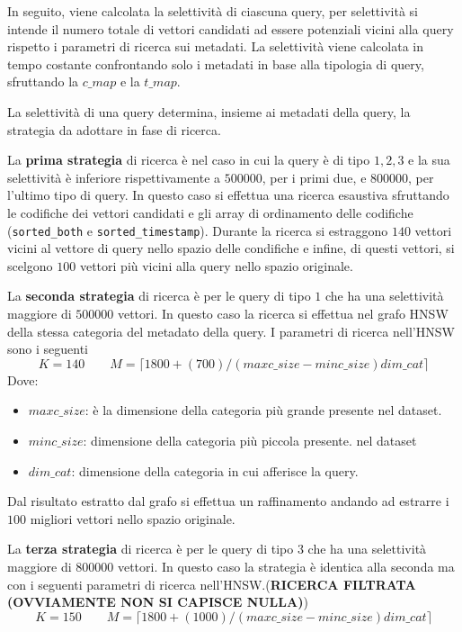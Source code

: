 In seguito, viene calcolata la selettività di ciascuna query, per selettività
si intende il numero totale di vettori candidati ad essere potenziali vicini alla 
query rispetto i parametri di ricerca sui metadati. 
La selettività viene calcolata in tempo costante confrontando solo i metadati in 
base alla tipologia di query, sfruttando la $c\_map$ e la $t\_map$. 

La selettività di una query determina, insieme ai metadati della query, la strategia 
da adottare in fase di ricerca.

La \textbf{prima strategia} di ricerca è nel caso in cui la query è di tipo $1,2,3$ 
e la sua selettività è inferiore rispettivamente a $500000$, per i primi due, e $800000$, 
per l'ultimo tipo di query. In questo caso 
si effettua una ricerca esaustiva sfruttando le codifiche dei vettori candidati 
e gli array di ordinamento delle codifiche (\texttt{sorted\_both} e \texttt{sorted\_timestamp}).
Durante la ricerca si estraggono $140$ vettori vicini al vettore di query nello 
spazio delle condifiche e infine, di questi vettori, si scelgono $100$ vettori 
più vicini alla query nello spazio originale. 

La \textbf{seconda strategia} di ricerca è per le query di tipo $1$ che ha una selettività 
maggiore di $500000$ vettori. In questo caso la ricerca si effettua nel grafo 
HNSW della stessa categoria del metadato della query. I parametri di ricerca nell'HNSW
sono i seguenti 
$$K = 140 \qquad M= \lceil1800+(700)/(maxc\_size - minc\_size)dim\_cat\rceil$$
Dove:
\begin{itemize}
    \item $maxc\_size$: è la dimensione della categoria più grande presente 
    nel dataset.
    \item $minc\_size$: dimensione della categoria più piccola presente.
    nel dataset
    \item $dim\_cat$: dimensione della categoria in cui afferisce la query.
\end{itemize}
Dal risultato estratto dal grafo si effettua un raffinamento andando ad estrarre 
i $100$ migliori vettori nello spazio originale.

La \textbf{terza strategia} di ricerca è per le query di tipo $3$ che ha una selettività 
maggiore di $800000$ vettori. In questo caso la strategia è identica alla seconda 
ma con i seguenti parametri di ricerca nell'HNSW.(\textbf{RICERCA FILTRATA (OVVIAMENTE NON SI CAPISCE NULLA)}) 
$$K = 150 \qquad M= \lceil1800+(1000)/(maxc\_size - minc\_size)dim\_cat\rceil$$

